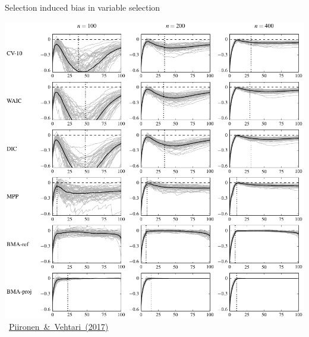 \documentclass[english,t]{beamer}
\begin{document}
\begin{frame}

  {\Large\color{navyblue} Selection induced bias in variable selection}

  \includegraphics[height=0.88\textheight]{simulated_variability.pdf}
   \vspace{-1.5\baselineskip}
   \mbox{{\hspace{8cm} \footnotesize \href{http://link.springer.com/article/10.1007/s11222-016-9649-y}{Piironen \& Vehtari (2017)}}}

\end{frame}
\end{document}
